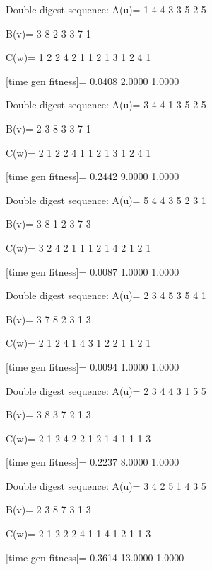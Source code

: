 Double digest sequence:
A(u)=
     1     4     4     3     3     5     2     5

B(v)=
     3     8     2     3     3     7     1

C(w)=
     1     2     2     4     2     1     1     2     1     3     1     2     4     1

[time gen fitness]=
    0.0408    2.0000    1.0000

Double digest sequence:
A(u)=
     3     4     4     1     3     5     2     5

B(v)=
     2     3     8     3     3     7     1

C(w)=
     2     1     2     2     4     1     1     2     1     3     1     2     4     1

[time gen fitness]=
    0.2442    9.0000    1.0000

Double digest sequence:
A(u)=
     5     4     4     3     5     2     3     1

B(v)=
     3     8     1     2     3     7     3

C(w)=
     3     2     4     2     1     1     1     2     1     4     2     1     2     1

[time gen fitness]=
    0.0087    1.0000    1.0000

Double digest sequence:
A(u)=
     2     3     4     5     3     5     4     1

B(v)=
     3     7     8     2     3     1     3

C(w)=
     2     1     2     4     1     4     3     1     2     2     1     1     2     1

[time gen fitness]=
    0.0094    1.0000    1.0000

Double digest sequence:
A(u)=
     2     3     4     4     3     1     5     5

B(v)=
     3     8     3     7     2     1     3

C(w)=
     2     1     2     4     2     2     1     2     1     4     1     1     1     3

[time gen fitness]=
    0.2237    8.0000    1.0000

Double digest sequence:
A(u)=
     3     4     2     5     1     4     3     5

B(v)=
     2     3     8     7     3     1     3

C(w)=
     2     1     2     2     2     4     1     1     4     1     2     1     1     3

[time gen fitness]=
    0.3614   13.0000    1.0000

